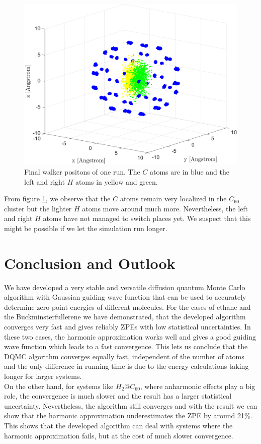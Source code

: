 \documentclass [12pt]{report}
\begin{document}
\begin{figure}[H]
\includegraphics[width=\linewidth] {h2@c60_2.png}
\caption{Final walker positons of one run. The $C$ atoms are in blue and the left and right $H$ atoms in yellow and green.} \label{h2@c60_2}
\end{figure}
From figure \ref{h2@c60_2}, we observe that the $C$ atoms remain very localized in the $C_{60}$ cluster but the lighter $H$ atoms move around much more. Nevertheless, the left and right $H$ atoms have not managed to switch places yet. We suspect that this might be possible if we let the simulation run longer.


\chapter{Conclusion and Outlook}
We have developed a very stable and versatile diffusion quantum Monte Carlo algorithm with Gaussian guiding wave function that can be used to accurately determine zero-point energies of different molecules. For the cases of ethane and the Buckminsterfullerene we have demonstrated, that the developed algorithm converges very fast and gives reliably ZPEs with low statistical uncertainties. In these two cases, the harmonic approximation works well and gives a good guiding wave function which leads to a fast convergence. This lets us conclude that the DQMC algorithm converges equally fast, independent of the number of atoms and the only difference in running time is due to the energy calculations taking longer for larger systems. \\
On the other hand, for systems like $H_2@C_{60}$, where anharmonic effects play a big role, the convergence is much slower and the result has a larger statistical uncertainty. Nevertheless, the algorithm still converges and with the result we can show that the harmonic approximation underestimates the ZPE by around 21\%. This shows that the developed algorithm can deal with systems where the harmonic approximation fails, but at the cost of much slower convergence.\\
\end{document}
